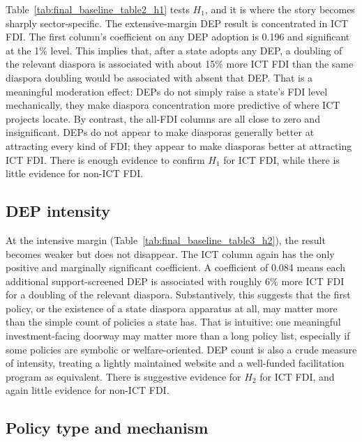 \documentclass[12pt]{article}
\begin{document}
Table~\ref{tab:final_baseline_table2_h1} tests $H_1$, and it is where the story becomes sharply sector-specific. The extensive-margin DEP result is concentrated in ICT FDI. The first column's coefficient on any DEP adoption is 0.196 and significant at the 1\% level. This implies that, after a state adopts any DEP, a doubling of the relevant diaspora is associated with about 15\% more ICT FDI than the same diaspora doubling would be associated with absent that DEP. That is a meaningful moderation effect: DEPs do not simply raise a state's FDI level mechanically, they make diaspora concentration more predictive of where ICT projects locate. By contrast, the all-FDI columns are all close to zero and insignificant. DEPs do not appear to make diasporas generally better at attracting every kind of FDI; they appear to make diasporas better at attracting ICT FDI. There is enough evidence to confirm $H_1$ for ICT FDI, while there is little evidence for non-ICT FDI.



\subsection{DEP intensity}

At the intensive margin (Table~\ref{tab:final_baseline_table3_h2}), the result becomes weaker but does not disappear. The ICT column again has the only positive and marginally significant coefficient. A coefficient of 0.084 means each additional support-screened DEP is associated with roughly 6\% more ICT FDI for a doubling of the relevant diaspora. Substantively, this suggests that the first policy, or the existence of a state diaspora apparatus at all, may matter more than the simple count of policies a state has. That is intuitive: one meaningful investment-facing doorway may matter more than a long policy list, especially if some policies are symbolic or welfare-oriented. DEP count is also a crude measure of intensity, treating a lightly maintained website and a well-funded facilitation program as equivalent. There is suggestive evidence for $H_2$ for ICT FDI, and again little evidence for non-ICT FDI.



\subsection{Policy type and mechanism}
\end{document}
